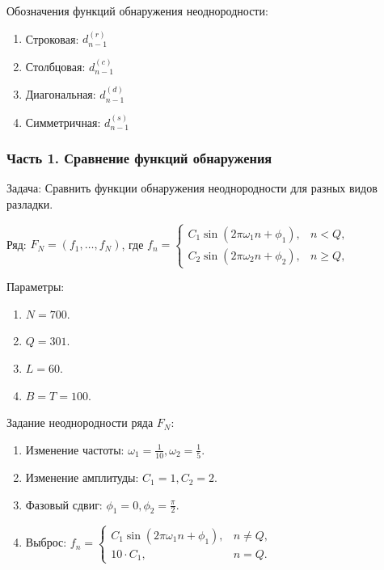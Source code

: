 \documentclass[pdf, 9pt,intlimits, unicode]{beamer}
\begin{document}
\begin{frame}
\begin{multicols}{2}
		\end{multicols}
	
		\bigskip
		
%		
%		
%		
		{\color{blue} Обозначения функций обнаружения неоднородности:}
		\begin{enumerate}
			\item Строковая: $ d_{n-1}^{(r)} $
			
			\item Столбцовая: $ d_{n-1}^{(c)} $
			
			\item Диагональная: $ d_{n-1}^{(d)} $
			
			\item Симметричная: $ d_{n-1}^{(s)} $
		\end{enumerate}
	\end{frame}

	\begin{frame}
		\frametitle{Часть 1. Сравнение функций обнаружения}
		{\color{blue} Задача:} 
		Сравнить функции обнаружения неоднородности для разных видов разладки.
		
		\bigskip
		{\color{blue} Ряд:}
		$ F_N=(f_1, \dots, f_{N}) $, где $f_n = 
		\begin{cases}
			C_1\sin(2\pi\omega_1n + \phi_1),& n < Q, \\
			C_2\sin(2\pi\omega_2n + \phi_2),& n \geq Q,
		\end{cases}$
		
		\bigskip
		{\color{blue} Параметры:}
		\begin{enumerate}
			\item $ N = 700 $.
			\item $ Q = 301 $.
			\item $ L = 60 $.
			\item $ B = T = 100 $.
		\end{enumerate}
	
		\bigskip
		
		{\color{blue} Задание неоднородности ряда $ F_N $:}
		\begin{enumerate}
			\item Изменение частоты: $\omega_1 = \frac{1}{10}, \omega_2 = \frac{1}{5}$.
			\item Изменение амплитуды: $C_1 = 1, C_2 = 2$.
			\item Фазовый сдвиг: $\phi_1 = 0, \phi_2 = \frac{\pi}{2}$.
			\item Выброс: $f_n = 
			\begin{cases}
				C_1\sin(2\pi\omega_1n + \phi_1), & n \neq Q, \\
				10\cdot C_1, & n = Q.
			\end{cases}
			$
		\end{enumerate}
	\end{frame}
	
\end{document}
